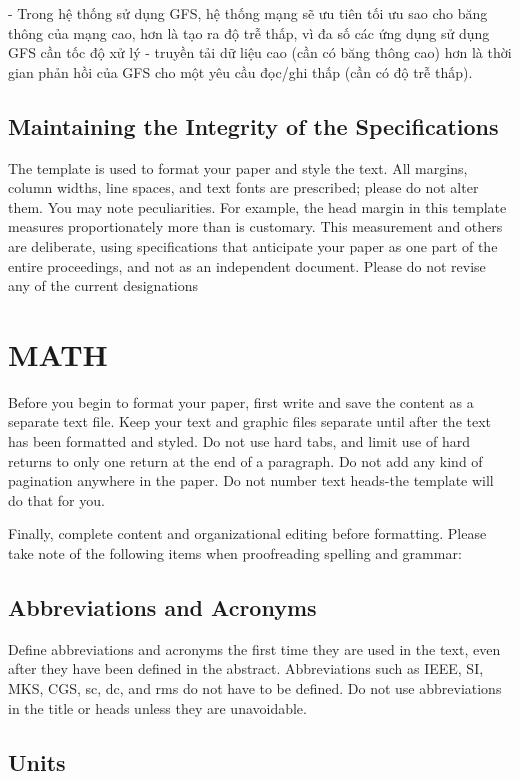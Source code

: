 \documentclass[a4paper, 10pt, conference]{IEEEconf}
\begin{document}
- Trong hệ thống sử dụng GFS, hệ thống mạng sẽ ưu tiên tối ưu sao cho băng thông của mạng cao, hơn là tạo ra độ trễ thấp, vì đa số các ứng dụng sử dụng GFS cần tốc độ xử lý - truyền tải dữ liệu cao (cần có băng thông cao) hơn là thời gian phản hồi của GFS cho một yêu cầu đọc/ghi thấp (cần có độ trễ thấp).

\subsection{Maintaining the Integrity of the Specifications}

The template is used to format your paper and style the text. All margins, column widths, line spaces, and text fonts are prescribed; please do not alter them. You may note peculiarities. For example, the head margin in this template measures proportionately more than is customary. This measurement and others are deliberate, using specifications that anticipate your paper as one part of the entire proceedings, and not as an independent document. Please do not revise any of the current designations

\section{MATH}

Before you begin to format your paper, first write and save the content as a separate text file. Keep your text and graphic files separate until after the text has been formatted and styled. Do not use hard tabs, and limit use of hard returns to only one return at the end of a paragraph. Do not add any kind of pagination anywhere in the paper. Do not number text heads-the template will do that for you.

Finally, complete content and organizational editing before formatting. Please take note of the following items when proofreading spelling and grammar:

\subsection{Abbreviations and Acronyms} Define abbreviations and acronyms the first time they are used in the text, even after they have been defined in the abstract. Abbreviations such as IEEE, SI, MKS, CGS, sc, dc, and rms do not have to be defined. Do not use abbreviations in the title or heads unless they are unavoidable.

\subsection{Units}
\end{document}
